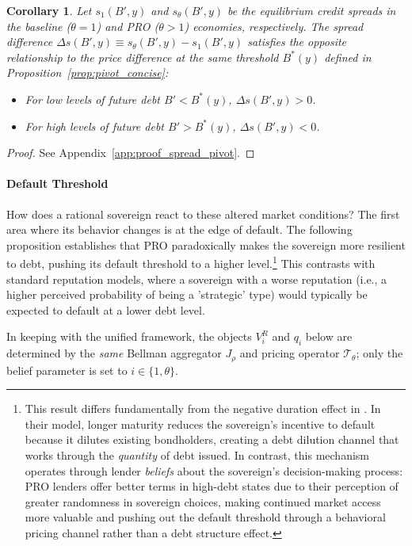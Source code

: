 \documentclass[12pt]{article}
\theoremstyle{plain}
\newtheorem{corollary}{Corollary}
\begin{document}
\begin{corollary}
	\label{cor:spread_pivot}
	Let $s_1(B', y)$ and $s_\theta(B', y)$ be the equilibrium credit spreads in the baseline ($\theta=1$) and PRO ($\theta>1$) economies, respectively. The spread difference $\Delta s(B', y) \equiv s_\theta(B', y) - s_1(B', y)$ satisfies the opposite relationship to the price difference at the same threshold $B^*(y)$ defined in Proposition~\ref{prop:pivot_concise}:
	\begin{itemize}
		\item For low levels of future debt $B' < B^*(y)$, $\Delta s(B', y) > 0$.
		\item For high levels of future debt $B' > B^*(y)$, $\Delta s(B', y) < 0$.
	\end{itemize}
\end{corollary}

\begin{proof}
	See Appendix~\ref{app:proof_spread_pivot}.
\end{proof}

\paragraph{Default Threshold}
How does a rational sovereign react to these altered market conditions? The
first area where its behavior changes is at the edge of default. The following
proposition establishes that PRO paradoxically makes the sovereign more
resilient to debt, pushing its default threshold to a higher
level.\footnote{This result differs fundamentally from the negative duration
	effect in \citet{ChatterjeeEyigungor2012}. In their model, longer maturity
	reduces the sovereign's incentive to default because it dilutes existing
	bondholders, creating a debt dilution channel that works through the
	\emph{quantity} of debt issued. In contrast, this mechanism operates through
	lender \emph{beliefs} about the sovereign's decision-making process: PRO
	lenders offer better terms in high-debt states due to their perception of
	greater randomness in sovereign choices, making continued market access more
	valuable and pushing out the default threshold through a behavioral pricing
	channel rather than a debt structure effect.} This contrasts with standard
reputation models, where a sovereign with a worse reputation (i.e., a higher
perceived probability of being a 'strategic' type) would typically be expected
to default at a lower debt level.

In keeping with the unified framework, the objects $V^R_i$ and $q_i$ below are
determined by the \emph{same} Bellman aggregator $J_\rho$ and pricing operator
$\mathcal T_\theta$; only the belief parameter is set to $i\in\{1,\theta\}$.
\end{document}
